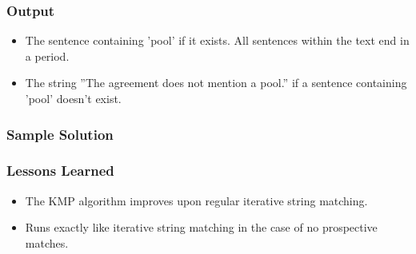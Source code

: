 \subsubsection{Output}
\begin{itemize}
	\item The sentence containing 'pool' if it exists. All sentences within the text end in a period.
	\item The string ''The agreement does not mention a pool.'' if a sentence containing 'pool' doesn't exist.
\end{itemize}


\subsubsection{Sample Solution}


\subsubsection{Lessons Learned}
\begin{itemize}
	\item The KMP algorithm improves upon regular iterative string matching.
	\item Runs exactly like iterative string matching in the case of no prospective matches.
\end{itemize}
